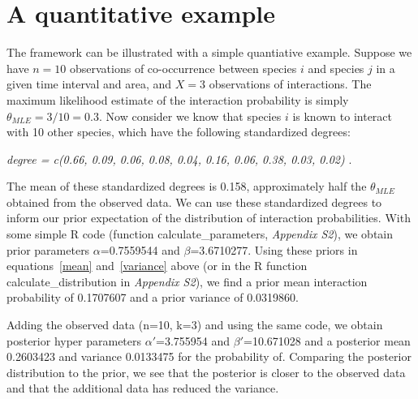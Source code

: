\documentclass[12pt]{article}
\begin{document}
\section*{A quantitative example}
The framework can be illustrated with a simple quantiative example. Suppose we have $n = 10$ observations of co-occurrence between species $i$ and species $j$ in a given time interval and area, and $X = 3$ observations of interactions. The maximum likelihood estimate of the interaction probability is simply $\theta_{MLE} = 3/10 = 0.3$. 
 Now consider we know that species $i$ is known to interact with 10 other species, which have the following standardized degrees:

\vspace{12pt}
\noindent\emph{
   degree = c(0.66, 0.09, 0.06, 0.08, 0.04, 0.16, 0.06, 0.38, 0.03, 0.02)
    }.
  \vspace{12pt}

The mean of these standardized degrees is 0.158, approximately half the $\theta_{MLE}$ obtained from the observed data. We can use these standardized degrees to inform our prior expectation of the 
distribution of interaction probabilities. With some simple R code (function calculate_parameters, \emph{Appendix S2}), we obtain prior parameters $\alpha$=0.7559544
and $\beta$=3.6710277. Using these priors in equations~\ref{mean} 
and~\ref{variance} above (or in the R function calculate_distribution in \emph{Appendix S2}), we find a prior mean interaction probability of 0.1707607 and a prior variance of 0.0319860.


Adding the observed data (n=10, k=3) and using the same code,
we obtain posterior hyper parameters $\alpha'$=3.755954 and $\beta'$=10.671028 and a posterior mean 0.2603423 and variance 0.0133475 for the probability of. Comparing the posterior distribution to the prior, we see that the posterior is closer to the observed data and that the additional data has reduced the variance.
\end{document}
